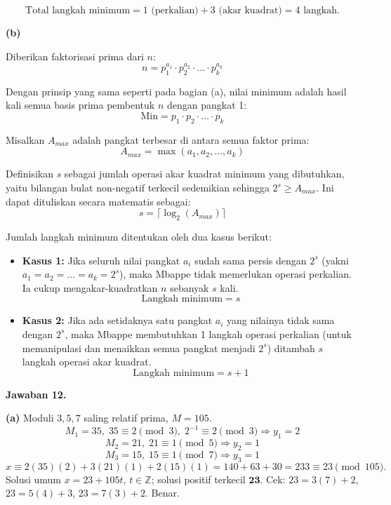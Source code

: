 \documentclass[11pt,a4paper]{article}
\newcommand{\jawab}[1]{\vspace{4pt}\noindent\textbf{Jawaban #1.}\par\nobreak\vspace{2pt}}
\newcommand{\Zset}{\mathbb{Z}}
\begin{document}
$$\text{Total langkah minimum} = 1 \text{ (perkalian)} + 3 \text{ (akar kuadrat)} = 4 \text{ langkah}.$$

\vspace{0.5cm}

\textbf{(b)}

Diberikan faktorisasi prima dari $n$:
$$n = p_1^{a_1} \cdot p_2^{a_2} \cdot \dots \cdot p_k^{a_k}$$


Dengan prinsip yang sama seperti pada bagian (a), nilai minimum adalah hasil kali semua basis prima pembentuk $n$ dengan pangkat 1:
$$\text{Min} = p_1 \cdot p_2 \cdot \dots \cdot p_k$$

Misalkan $A_{max}$ adalah pangkat terbesar di antara semua faktor prima:
$$A_{max} = \max(a_1, a_2, \dots, a_k)$$

Definisikan $s$ sebagai jumlah operasi akar kuadrat minimum yang dibutuhkan, yaitu bilangan bulat non-negatif terkecil sedemikian sehingga $2^s \ge A_{max}$. Ini dapat dituliskan secara matematis sebagai:
$$s = \lceil \log_2(A_{max}) \rceil$$

Jumlah langkah minimum ditentukan oleh dua kasus berikut:
\begin{itemize}
    \item \textbf{Kasus 1:} Jika seluruh nilai pangkat $a_i$ sudah sama persis dengan $2^s$ (yakni $a_1 = a_2 = \dots = a_k = 2^s$), maka Mbappe tidak memerlukan operasi perkalian. Ia cukup mengakar-kuadratkan $n$ sebanyak $s$ kali.
    $$\text{Langkah minimum} = s$$
    
    \item \textbf{Kasus 2:} Jika ada setidaknya satu pangkat $a_i$ yang nilainya tidak sama dengan $2^s$, maka Mbappe membutuhkan 1 langkah operasi perkalian (untuk memanipulasi dan menaikkan semua pangkat menjadi $2^s$) ditambah $s$ langkah operasi akar kuadrat.
    $$\text{Langkah minimum} = s + 1$$
\end{itemize}

\jawab{12}
\textbf{(a)} Moduli $3,5,7$ saling relatif prima, $M = 105$.
\[
M_1 = 35,\; 35 \equiv 2 \pmod 3,\; 2^{-1} \equiv 2 \pmod 3 \Rightarrow y_1 = 2
\]
\[
M_2 = 21,\; 21 \equiv 1 \pmod 5 \Rightarrow y_2 = 1
\]
\[
M_3 = 15,\; 15 \equiv 1 \pmod 7 \Rightarrow y_3 = 1
\]
\[
x \equiv 2(35)(2) + 3(21)(1) + 2(15)(1) = 140 + 63 + 30 = 233 \equiv 23 \pmod{105}.
\]
Solusi umum $x = 23 + 105t$, $t \in \Zset$; solusi positif terkecil $\mathbf{23}$.
Cek: $23 = 3(7)+2$, $23 = 5(4)+3$, $23 = 7(3)+2$. Benar.
\end{document}
